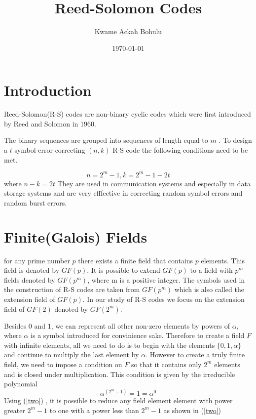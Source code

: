 \documentclass[fontsize=12pt]{article}
\title{Reed-Solomon Codes }
\author{Kwame Ackah Bohulu}
\date{\today}
\begin{document}
\maketitle

\newpage
\section{Introduction}
Reed-Solomon(R-S) codes are non-binary cyclic codes which were first introduced by Reed and Solomon in 1960. 

The binary sequences are grouped into sequences of length equal to $m$ . 
To design a $t$ symbol-error correcting $(n,k)$ R-S code the following conditions need to be met.

\begin{equation}
n= 2^m -1 , k=2^m -1 -2t
\label{one}
\end{equation}
where $n-k=2t$
They are used in communication systems and especially in data storage systems and are very efffective in correcting random symbol errors and random burst errors. 


\section{Finite(Galois) Fields}
for any prime number $p$ there exists a finite field that contains $p$ elements. This field
is denoted by $GF(p)$. It is possible to extend $GF(p)$ to a field with $p^m$ fields denoted by $GF(p^m)$, where m is a positive integer. The symbols used in the construction of R-S codes are taken from $GF(p^m)$ which is also called the extension field of $GF(p)$. In our study of R-S codes we focus on the extension field of $GF(2)$ denoted by $GF(2^m)$. 

Besides $0$ and $1$, we can represent all other non-zero elements by powers of $\alpha$, where $\alpha$ is a symbol introduced for convinience sake. Therefore to create a field $F$ with infinite elements, all we need to do is to begin with the elements $\{ 0,1,\alpha \}$ and continue to multiply the last element by $\alpha$. However to create a truly finite field, we need to impose a condition on $F$ so that it contains only $2^m$ elements and is closed under multiplication. This condition is given by the irreducible polynomial 
\begin{equation}
\alpha^{(2^m-1)} = 1 =\alpha^0
\label{two}
\end{equation}
Using (\ref{two}) , it is possible to reduce any field element element with power greater $2^m-1$ to one with a power less than $2^m -1$ as shown in (\ref{two})
\end{document}
